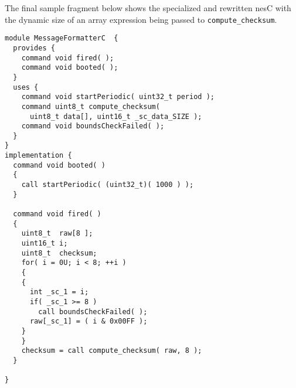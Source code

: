 The final sample fragment below shows the specialized and rewritten nesC with the dynamic size
of an array expression being passed to \texttt{compute\_checksum}.

\singlespace
\vspace{1.0ex}
\begin{lstlisting}[language=nesC]
module MessageFormatterC  {
  provides {
    command void fired( );
    command void booted( );
  }
  uses {
    command void startPeriodic( uint32_t period );
    command uint8_t compute_checksum(
      uint8_t data[], uint16_t _sc_data_SIZE );
    command void boundsCheckFailed( );
  }
}
implementation {
  command void booted( ) 
  {
    call startPeriodic( (uint32_t)( 1000 ) );
  }

  command void fired( ) 
  {
    uint8_t  raw[8 ];
    uint16_t i;
    uint8_t  checksum;
    for( i = 0U; i < 8; ++i )
    {
    {
      int _sc_1 = i;
      if( _sc_1 >= 8 )
        call boundsCheckFailed( );
      raw[_sc_1] = ( i & 0x00FF );
    }
    }
    checksum = call compute_checksum( raw, 8 );
  }

}
\end{lstlisting}
\vspace{1.0ex}
\primaryspacing
